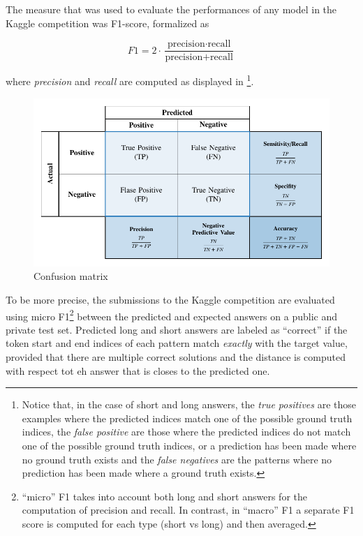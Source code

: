 \documentclass[10pt,hidelinks]{article}
\begin{document}
The measure that was used to evaluate the performances of any model in the Kaggle competition was F1-score, formalized as

\begin{equation}\label{eq:f1}
F1 = 2 \cdot \frac{\text{precision} \cdot \text{recall}}{\text{precision} + \text{recall}}
\end{equation}

where \emph{precision} and \emph{recall} are computed as displayed in \footnote{Notice that, in the case of short and long answers, the \emph{true positives} are those examples where the predicted indices match one of the possible ground truth indices, the \emph{false positive} are those where the predicted indices do not match one of the possible ground truth indices, or a prediction has been made where no ground truth exists and the \emph{false negatives} are the patterns where no prediction has been made where a ground truth exists.}.

\begin{figure}[h]
	\centering
  	\includegraphics[scale=0.7]{pics/confusionMatrix.pdf}
	\caption{Confusion matrix}\label{fig:confusion}
\end{figure}

\noindent To be more precise, the submissions to the Kaggle competition are evaluated using micro F1\footnote{``micro'' F1 takes into account both long and short answers for the computation of precision and recall. In contrast, in ``macro'' F1 a separate F1 score is computed for each type (short vs long) and then averaged.} between the predicted and expected answers on a public and private test set.
Predicted long and short answers are labeled as ``correct'' if the token start and end indices of each pattern match \emph{exactly} with the target value, provided that there are multiple correct solutions and the distance is computed with respect tot eh answer that is closes to the predicted one.
\end{document}
